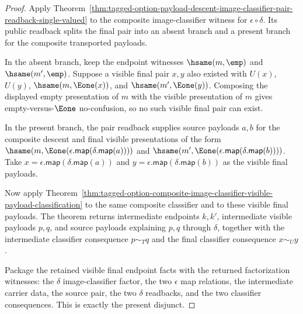 \begin{proof}
Apply
Theorem~\ref{thm:tagged-option-payload-descent-image-classifier-pair-readback-single-valued}
to the composite image-classifier witness for $\epsilon\circ\delta$. Its public
readback splits the final pair into an absent branch and a present branch for
the composite transported payloads.

In the absent branch, keep the endpoint witnesses $\hsame(m,\emp)$ and
$\hsame(m',\emp)$. Suppose a visible final pair $x,y$ also existed with $U(x)$,
$U(y)$, $\hsame(m,\Eone(x))$, and $\hsame(m',\Eone(y))$. Composing the displayed
empty presentation of $m$ with the visible presentation of $m$ gives
empty-versus-$\Eone$ no-confusion, so no such visible final pair can exist.

In the present branch, the pair readback supplies source payloads $a,b$ for the
composite descent and final visible presentations of the form
$\hsame(m,\Eone(\epsilon.\mathsf{map}(\delta.\mathsf{map}(a))))$ and
$\hsame(m',\Eone(\epsilon.\mathsf{map}(\delta.\mathsf{map}(b))))$. Take
$x=\epsilon.\mathsf{map}(\delta.\mathsf{map}(a))$ and
$y=\epsilon.\mathsf{map}(\delta.\mathsf{map}(b))$ as the visible final payloads.

Now apply
Theorem~\ref{thm:tagged-option-composite-image-classifier-visible-payload-classification}
to the same composite classifier and to these visible final payloads. The
theorem returns intermediate endpoints $k,k'$, intermediate visible payloads
$p,q$, and source payloads explaining $p,q$ through $\delta$, together with the
intermediate classifier consequence $p\sim_T q$ and the final classifier
consequence $x\sim_U y$.

Package the retained visible final endpoint facts with the returned
factorization witnesses: the $\delta$ image-classifier factor, the two
$\epsilon$ map relations, the intermediate carrier data, the source pair, the
two $\delta$ readbacks, and the two classifier consequences. This is exactly
the present disjunct.
\end{proof}

